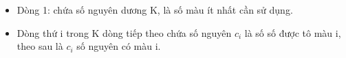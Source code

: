 \begin{itemize}
	\item     Dòng 1: chứa số nguyên dương K, là số màu ít nhất cần sử dụng.   
	\item     Dòng thứ i trong K dòng tiếp theo chứa số nguyên $c_{i}$    là số số được tô màu i, theo sau là $c_{i}$    số nguyên có màu i.   
\end{itemize}